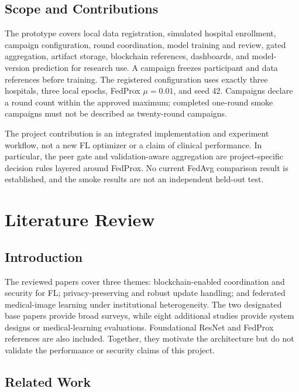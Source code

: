 \documentclass[12pt,a4paper]{report}
\begin{document}
\section{Scope and Contributions}
The prototype covers local data registration, simulated hospital enrollment, campaign configuration, round coordination, model training and review, gated aggregation, artifact storage, blockchain references, dashboards, and model-version prediction for research use. A campaign freezes participant and data references before training. The registered configuration uses exactly three hospitals, three local epochs, FedProx $\mu=0.01$, and seed 42. Campaigns declare a round count within the approved maximum; completed one-round smoke campaigns must not be described as twenty-round campaigns.

The project contribution is an integrated implementation and experiment workflow, not a new FL optimizer or a claim of clinical performance. In particular, the peer gate and validation-aware aggregation are project-specific decision rules layered around FedProx. No current FedAvg comparison result is established, and the smoke results are not an independent held-out test.

\chapter{Literature Review}
\section{Introduction}
The reviewed papers cover three themes: blockchain-enabled coordination and security for FL; privacy-preserving and robust update handling; and federated medical-image learning under institutional heterogeneity. The two designated base papers provide broad surveys, while eight additional studies provide system designs or medical-learning evaluations. Foundational ResNet and FedProx references are also included. Together, they motivate the architecture but do not validate the performance or security claims of this project.

\section{Related Work}
\end{document}

